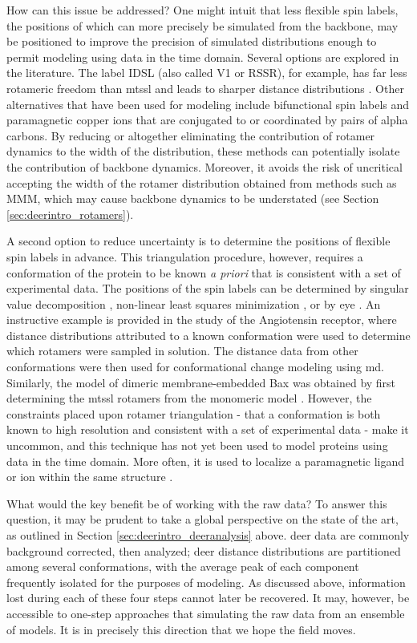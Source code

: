 How can this issue be addressed? One might intuit that less flexible spin labels, the positions of which can more precisely be simulated from the backbone, may be positioned to improve the precision of simulated distributions enough to permit modeling using data in the time domain. Several options are explored in the literature. The label IDSL (also called V1 or RSSR), for example, has far less rotameric freedom than \gls{mtssl} and leads to sharper distance distributions \citep*{Balo2016, Warshaviak2013}. Other alternatives that have been used for modeling include bifunctional spin labels \citep*{Fajer2015, Islam2015, Sahu2017} and paramagnetic copper ions \citep*{Cunningham2015, Merz2014} that are conjugated to or coordinated by pairs of alpha carbons. By reducing or altogether eliminating the contribution of rotamer dynamics to the width of the distribution, these methods can potentially isolate the contribution of backbone dynamics. Moreover, it avoids the risk of uncritical accepting the width of the rotamer distribution obtained from methods such as MMM, which may cause backbone dynamics to be understated (see Section \ref{sec:deerintro_rotamers}).

A second option to reduce uncertainty is to determine the positions of flexible spin labels in advance. This triangulation procedure, however, requires a conformation of the protein to be known \emph{a priori} that is consistent with a set of experimental data. The positions of the spin labels can be determined by singular value decomposition  \citep*{Hagelueken2013}, non-linear least squares minimization \citep*{Bleicken2014}, or by eye \citep*{Wingler2019}. An instructive example is provided in the study of the Angiotensin receptor, where distance distributions attributed to a known conformation were used to determine which rotamers were sampled in solution\citep*{Wingler2019}. The distance data from other conformations were then used for conformational change modeling using \gls{md}. Similarly, the model of dimeric membrane-embedded Bax was obtained by first determining the \gls{mtssl} rotamers from the monomeric model \citep*{Bleicken2014}. However, the constraints placed upon rotamer triangulation - that a conformation is both known to high resolution and consistent with a set of experimental data - make it uncommon, and this technique has not yet been used to model proteins using data in the time domain. More often, it is used to localize a paramagnetic ligand or ion within the same structure \citep*{Gaffney2012, Yang2012}.

What would the key benefit be of working with the raw data? To answer this question, it may be prudent to take a global perspective on the state of the art, as outlined in Section \ref{sec:deerintro_deeranalysis} above. \Gls{deer} data are commonly background corrected, then analyzed; \gls{deer} distance distributions are partitioned among several conformations, with the average peak of each component frequently isolated for the purposes of modeling. As discussed above, information lost during each of these four steps cannot later be recovered. It may, however, be accessible to one-step approaches that simulating the raw data from an ensemble of models. It is in precisely this direction that we hope the field moves.